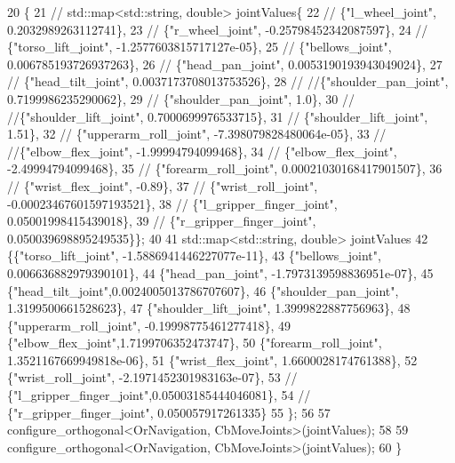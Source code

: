 \begin{DoxyCode}
20     \{
21     \textcolor{comment}{//    std::map<std::string, double> jointValues\{}
22     \textcolor{comment}{//         \{"l\_wheel\_joint", 0.2032989263112741\},}
23     \textcolor{comment}{//         \{"r\_wheel\_joint", -0.25798452342087597\},}
24     \textcolor{comment}{//         \{"torso\_lift\_joint", -1.2577603815717127e-05\},}
25     \textcolor{comment}{//         \{"bellows\_joint", 0.006785193726937263\},}
26     \textcolor{comment}{//         \{"head\_pan\_joint", 0.0053190193943049024\},}
27     \textcolor{comment}{//         \{"head\_tilt\_joint", 0.0037173708013753526\},}
28     \textcolor{comment}{//         //\{"shoulder\_pan\_joint", 0.7199986235290062\},}
29     \textcolor{comment}{//         \{"shoulder\_pan\_joint", 1.0\},}
30     \textcolor{comment}{//         //\{"shoulder\_lift\_joint", 0.7000699976533715\},}
31     \textcolor{comment}{//         \{"shoulder\_lift\_joint", 1.51\},}
32     \textcolor{comment}{//         \{"upperarm\_roll\_joint", -7.398079828480064e-05\},}
33     \textcolor{comment}{//         //\{"elbow\_flex\_joint", -1.99994794099468\},}
34     \textcolor{comment}{//         \{"elbow\_flex\_joint", -2.49994794099468\},}
35     \textcolor{comment}{//         \{"forearm\_roll\_joint", 0.00021030168417901507\},}
36     \textcolor{comment}{//         \{"wrist\_flex\_joint", -0.89\},}
37     \textcolor{comment}{//         \{"wrist\_roll\_joint", -0.00023467601597193521\},}
38     \textcolor{comment}{//         \{"l\_gripper\_finger\_joint", 0.05001998415439018\},}
39     \textcolor{comment}{//         \{"r\_gripper\_finger\_joint", 0.050039698895249535\}\};}
40 
41      std::map<std::string, double> jointValues
42        \{\{\textcolor{stringliteral}{"torso\_lift\_joint"}, -1.5886941446227077e-11\},
43         \{\textcolor{stringliteral}{"bellows\_joint"}, 0.006636882979390101\},
44         \{\textcolor{stringliteral}{"head\_pan\_joint"}, -1.7973139598836951e-07\},
45         \{\textcolor{stringliteral}{"head\_tilt\_joint"},0.0024005013786707607\},
46         \{\textcolor{stringliteral}{"shoulder\_pan\_joint"}, 1.3199500661528623\},
47         \{\textcolor{stringliteral}{"shoulder\_lift\_joint"}, 1.3999822887756963\},
48         \{\textcolor{stringliteral}{"upperarm\_roll\_joint"}, -0.19998775461277418\},
49         \{\textcolor{stringliteral}{"elbow\_flex\_joint"},1.7199706352473747\},
50         \{\textcolor{stringliteral}{"forearm\_roll\_joint"}, 1.3521167669949818e-06\},
51         \{\textcolor{stringliteral}{"wrist\_flex\_joint"}, 1.6600028174761388\},
52         \{\textcolor{stringliteral}{"wrist\_roll\_joint"}, -2.1971452301983163e-07\},
53         \textcolor{comment}{// \{"l\_gripper\_finger\_joint",0.05003185444046081\},}
54         \textcolor{comment}{// \{"r\_gripper\_finger\_joint", 0.050057917261335\}}
55         \};
56 
57         configure\_orthogonal<OrNavigation, CbMoveJoints>(jointValues);
58 
59         configure\_orthogonal<OrNavigation, CbMoveJoints>(jointValues);
60     \}
\end{DoxyCode}


